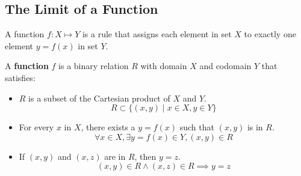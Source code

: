 \subsection{The Limit of a Function}
A function \(f:X\mapsto Y\) is a rule that assigns each element in set \(X\) to exactly
one element \(y=f(x)\) in set \(Y\).
\begin{definition}
    A \textbf{function} \(f\) is a binary relation \(R\) with domain \(X\) and
    codomain \(Y\) that satisfies:
    \begin{itemize}
        \item \(R\) is a subset of the Cartesian product of \(X\) and \(Y\).
        \[R\subset\{(x,y)\mid x\in X,y\in Y\}\]
        \item For every \(x\) in \(X\), there exists a \(y=f(x)\) such that
        \((x,y)\) is in \(R\).
        \[\forall x\in X,\exists y=f(x)\in Y,(x,y)\in R\]
        \item If \((x,y)\) and \((x,z)\) are in \(R\), then \(y=z\).
        \[(x,y)\in R \wedge (x,z)\in R \implies y=z\]
    \end{itemize}
\end{definition}